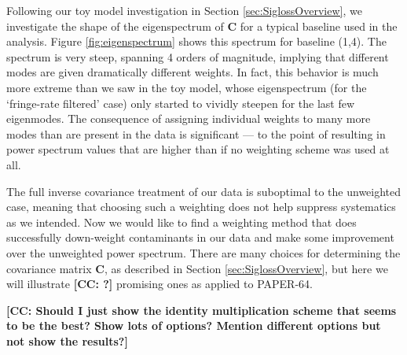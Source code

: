 \documentclass[preprint2,numberedappendix,tighten]{aastex6}  %
\newcommand{\cc}[1]{{\color{purple} \textbf{[CC: #1]}}}
\begin{document}

Following our toy model investigation in Section \ref{sec:SiglossOverview}, we investigate the shape of the eigenspectrum of $\textbf{C}$ for a typical baseline used in the analysis. Figure \ref{fig:eigenspectrum} shows this spectrum for baseline (1,4). The spectrum is very steep, spanning 4 orders of magnitude, implying that different modes are given dramatically different weights. In fact, this behavior is much more extreme than we saw in the toy model, whose eigenspectrum (for the `fringe-rate filtered' case) only started to vividly steepen for the last few eigenmodes. The consequence of assigning individual weights to many more modes than are present in the data is significant --- to the point of resulting in power spectrum values that are higher than if no weighting scheme was used at all.


The full inverse covariance treatment of our data is suboptimal to the unweighted case, meaning that choosing such a weighting does not help suppress systematics as we intended. Now we would like to find a weighting method that does successfully down-weight contaminants in our data and make some improvement over the unweighted power spectrum. There are many choices for determining the covariance matrix $\textbf{C}$, as described in Section \ref{sec:SiglossOverview}, but here we will illustrate \cc{?} promising ones as applied to PAPER-64.

\cc{Should I just show the identity multiplication scheme that seems to be the best? Show lots of options? Mention different options but not show the results?}
\end{document}
